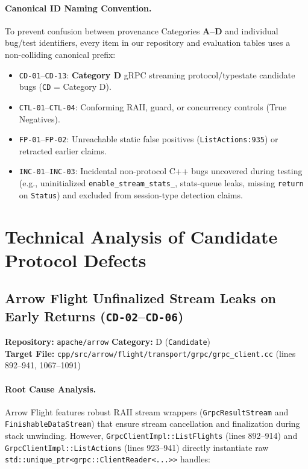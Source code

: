\documentclass[11pt,a4paper]{article}
\begin{document}
\paragraph{Canonical ID Naming Convention.}
To prevent confusion between provenance Categories \textbf{A--D} and individual bug/test identifiers, every item in our repository and evaluation tables uses a non-colliding canonical prefix:
\begin{itemize}
    \item \texttt{CD-01}--\texttt{CD-13}: \textbf{Category D} gRPC streaming protocol/typestate candidate bugs (\texttt{CD} = Category D).
    \item \texttt{CTL-01}--\texttt{CTL-04}: Conforming RAII, guard, or concurrency controls (True Negatives).
    \item \texttt{FP-01}--\texttt{FP-02}: Unreachable static false positives (\texttt{ListActions:935}) or retracted earlier claims.
    \item \texttt{INC-01}--\texttt{INC-03}: Incidental non-protocol C++ bugs uncovered during testing (e.g., uninitialized \texttt{enable\_stream\_stats\_}, stats-queue leaks, missing \texttt{return} on \texttt{Status}) and excluded from session-type detection claims.
\end{itemize}

\section{Technical Analysis of Candidate Protocol Defects}

\subsection{Arrow Flight Unfinalized Stream Leaks on Early Returns (\texttt{CD-02}--\texttt{CD-06})}
\textbf{Repository:} \texttt{apache/arrow} \hfill \textbf{Category:} D (\texttt{Candidate})\\
\textbf{Target File:} \texttt{cpp/src/arrow/flight/transport/grpc/grpc\_client.cc} (lines 892--941, 1067--1091)

\paragraph{Root Cause Analysis.}
Arrow Flight features robust RAII stream wrappers (\texttt{GrpcResultStream} and \texttt{FinishableDataStream}) that ensure stream cancellation and finalization during stack unwinding. However, \texttt{GrpcClientImpl::ListFlights} (lines 892--914) and \texttt{GrpcClientImpl::ListActions} (lines 923--941) directly instantiate raw \texttt{std::unique\_ptr<grpc::ClientReader<...>>} handles:
\end{document}
